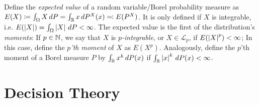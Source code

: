 \documentclass[a4paper]{scrreprt}
\begin{document}
    Define the \emph{expected value} of a random variable/Borel probability measure as $E(X) \coloneqq \int_{\Omega} X \, dP = \int_{\mathbb{R}} x \, dP^X(x) \eqqcolon E(P^X)$. It is only defined if $X$ is integrable, i.e. $E(\left| X \right|) = \int_{\Omega} \left| X \right| \, dP < \infty$. 
    The expected value is the first of the distribution's \emph{moments}:
    If $p \in \mathbb{N}$, we say that $X$ is \emph{$p$-integrable}, or $X \in \mathcal{L}_p$, if $E(\left| X \right|^p) < \infty$;
    In this case, define the \emph{$p$'th moment} of $X$ as $E(X^p)$. Analogously, define the $p$'th moment of a Borel measure $P$ by $\int_{\mathbb{R}} x^k \, dP(x)$ if $\int_{\mathbb{R}} \left| x \right|^k \, dP(x) < \infty$.
    
    
    \section{Decision Theory}
    
    
\end{document}
